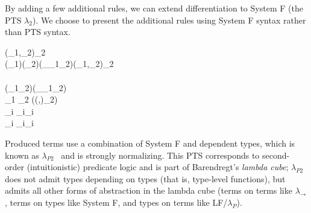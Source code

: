 By adding a few additional rules, we can extend differentiation to System F (the
PTS \ensuremath{\lambda_{2}}). We choose to present the additional rules using System F syntax
rather than PTS syntax.
\begin{hscode}\SaveRestoreHook
{}%
%
%
%
\>[3]{}(_{1},_{2})\in \Delta_2\mathrel{=}{}\<[E]%
\\
\>[3]{}\<[5]%
\>[5]{}\Pi (\alpha_{1}\typcolon\star)\hsforall \;(\alpha_{2}\typcolon\star)\;(\Delta_\alpha\typcolon\alpha_{1}\to \alpha_{2}\to \star)(_{1},_{2})\in \Delta_2\mean{\tau}{}\<[E]%
\\
\>[3]{}\mathrel{=}{}\<[E]%
\\
\>[3]{}\<[5]%
\>[5]{}\lambda (\alpha_{1}\;\alpha_{2}\typcolon\star)\;(\Delta_\alpha\typcolon\alpha_{1}\to \alpha_{2}\to \star)\to {}\<[E]%
\\
\>[3]{}\mathrel{=}\;_1 \mean{\tau}\;_2 \mean{\tau}\;((\text{\textendash},\text{\textendash})\in \Delta_2\mean{\tau}){}\<[E]%
\\[\blanklineskip]%
\>[3]{}_i \mathrel{=}\forall \alpha_i\hsforall {}_i \mean{\tau}{}\<[E]%
\\
\>[3]{}_i \mathrel{=}\Lambda \alpha_i\hsforall {}_i \<[E]%
\ColumnHook
\end{hscode}\resethooks
Produced terms use a combination of System F and dependent types, which is known
as \ensuremath{\lambda_{P2}}~\citep{Barendregt1992lambda} and is strongly normalizing. This PTS
corresponds to second-order (intuitionistic) predicate logic and is part of
Barendregt's \emph{lambda cube}; \ensuremath{\lambda_{P2}} does not admit types depending on types
(that is, type-level functions), but admits all other forms of abstraction in
the lambda cube (terms on terms like \ensuremath{\lambda_{\to}}, terms on types like System F, and
types on terms like LF/\ensuremath{\lambda_P}).

